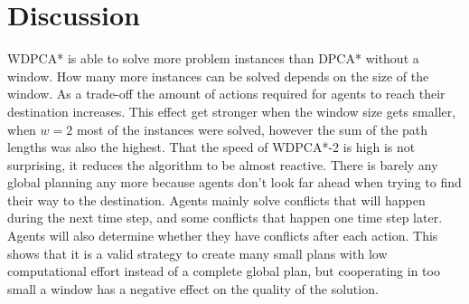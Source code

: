 \section{Discussion}\label{sec:discussion}


WDPCA* is able to solve more problem instances than DPCA* without a window. How
many more instances can be solved depends on the size of the window. As a
trade-off the amount of actions required for agents to reach their destination
increases. This effect get stronger when the window size gets smaller, when
$w=2$ most of the instances were solved, however the sum of the path lengths
was also the highest. That the speed of WDPCA*-2 is high is not surprising, it
reduces the algorithm to be almost reactive. There is barely any global
planning any more because agents don't look far ahead when trying to find their
way to the destination. Agents mainly solve conflicts that will
happen during the next time step, and some conflicts that happen one time step
later. Agents will also determine whether they have conflicts after each action.
This shows that it is a valid strategy to create many small plans with
low computational effort instead of a complete global plan, but cooperating in
too small a window has a negative effect on the quality of the solution.

